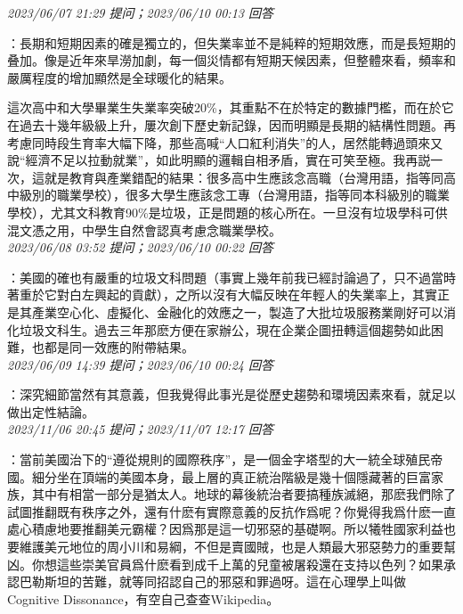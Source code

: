 \documentclass[twocolumn]{ctexart}
\begin{document}
\textit{\hfill\noindent\small 2023/06/07 21:29 提问；2023/06/10 00:13 回答}

：長期和短期因素的確是獨立的，但失業率並不是純粹的短期效應，而是長短期的叠加。像是近年來旱澇加劇，每一個災情都有短期天候因素，但整體來看，頻率和嚴厲程度的增加顯然是全球暖化的結果。

這次高中和大學畢業生失業率突破20\%，其重點不在於特定的數據門檻，而在於它在過去十幾年級級上升，屢次創下歷史新記錄，因而明顯是長期的結構性問題。再考慮同時段生育率大幅下降，那些高喊“人口紅利消失”的人，居然能轉過頭來又說“經濟不足以拉動就業”，如此明顯的邏輯自相矛盾，實在可笑至極。我再説一次，這就是教育與產業錯配的結果：很多高中生應該念高職（台灣用語，指等同高中級別的職業學校），很多大學生應該念工專（台灣用語，指等同本科級別的職業學校），尤其文科教育90\%是垃圾，正是問題的核心所在。一旦沒有垃圾學科可供混文憑之用，中學生自然會認真考慮念職業學校。
\\

\textit{\hfill\noindent\small 2023/06/08 03:52 提问；2023/06/10 00:22 回答}

：美國的確也有嚴重的垃圾文科問題（事實上幾年前我已經討論過了，只不過當時著重於它對白左興起的貢獻），之所以沒有大幅反映在年輕人的失業率上，其實正是其產業空心化、虛擬化、金融化的效應之一，製造了大批垃圾服務業剛好可以消化垃圾文科生。過去三年那麽方便在家辦公，現在企業企圖扭轉這個趨勢如此困難，也都是同一效應的附帶結果。
\\

\textit{\hfill\noindent\small 2023/06/09 14:39 提问；2023/06/10 00:24 回答}

：深究細節當然有其意義，但我覺得此事光是從歷史趨勢和環境因素來看，就足以做出定性結論。
\\

\textit{\hfill\noindent\small 2023/11/06 20:45 提问；2023/11/07 12:17 回答}

：當前美國治下的“遵從規則的國際秩序”，是一個金字塔型的大一統全球殖民帝國。細分坐在頂端的美國本身，最上層的真正統治階級是幾十個隱藏著的巨富家族，其中有相當一部分是猶太人。地球的幕後統治者要搞種族滅絕，那麽我們除了試圖推翻既有秩序之外，還有什麽有實際意義的反抗作爲呢？你覺得我爲什麽一直處心積慮地要推翻美元霸權？因爲那是這一切邪惡的基礎啊。所以犧牲國家利益也要維護美元地位的周小川和易綱，不但是賣國賊，也是人類最大邪惡勢力的重要幫凶。你想這些崇美官員爲什麽看到成千上萬的兒童被屠殺還在支持以色列？如果承認巴勒斯坦的苦難，就等同招認自己的邪惡和罪過呀。這在心理學上叫做Cognitive Dissonance，有空自己查查Wikipedia。
\end{document}
